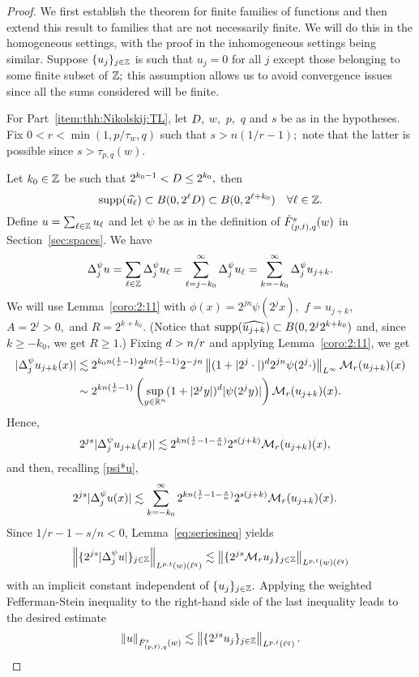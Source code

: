 \begin{proof} We first establish the theorem for finite families of functions and then extend this result to families that are not necessarily finite.  We will do this in the homogeneous settings, with the proof in the inhomogeneous settings being similar. Suppose $\{u_j\}_{j\in\ent}$ is such that $u_j=0$ for all $j$ except those belonging to some finite subset of $\ent;$  this assumption allows us to avoid convergence issues since all the sums  considered will be finite.

For Part~\eqref{item:thh:Nikolskij:TL}, let $\A,$ $w,$ $p,$ $q$ and $s$ be as in the hypotheses. Fix $0<r<\min(1,p/\tau_w,q)$ such that  $s>n(1/r-1);$ note that the latter is possible since $s>\tau_{p,q}(w).$ 


Let $k_0 \in \ent$ be such that $2^{k_0 -1} < \A\leq 2^{k_0},$ then  
$$
\supp(\widehat{u_\ell}) \subset B(0, 2^\ell \A) \subset B(0, 2^{\ell +k_0}) \quad \forall \ell \in \ent.
$$
Define $u =\sum_{\ell \in \ent} u_\ell$ and let $\psi$ be as in the definition of $\tlw{(p,t)}{s}{q}{w}$ in Section~\ref{sec:spaces}. We have
\begin{equation}\label{psi*u}
\Delta^\psi_j u = \sum_{\ell \in \ent} \Delta^\psi_j u_\ell = \sum_{\ell = j - k_0}^\infty \Delta^\psi_j  u_\ell = \sum_{k = - k_0}^\infty \Delta^\psi_j u_{j+k}.
\end{equation}
We will use Lemma~\ref{coro:2:11} with $\phi(x) =  2^{jn} \psi(2^j x),$  $f = u_{j+k},$  $A= 2^{j  } >0,$ and $R= 2^{k + k_0}.$ (Notice that $\supp(\widehat{u_{j+k}}) \subset  B(0, 2^{j} 2^{k + k_0})$ and, since $k \geq -k_0$, we get $R \geq 1$.) Fixing  $\ex>n/r$ and applying Lemma~\ref{coro:2:11}, we get
\begin{align*}
|\Delta^\psi_j  u_{j+k}(x)| & \lesssim   2^{k_0n(\frac{1}{r} -1)} 2^{k n (\frac{1}{r} -1)}  2^{-jn} \norm{(1 + |2^j \cdot|)^\ex 2^{jn}\psi (2^j\cdot)}{L^\infty}  \M_r(u_{j+k})(x)\\
& \sim  2^{k n (\frac{1}{r} -1)} \left( \sup_{y \in \rn} (1 + |2^j y|)^\ex |\psi(2^j y)|\right) \M_r(u_{j+k})(x).
\end{align*}
 Hence,
\begin{align*}
2^{js}|\Delta^\psi_j  u_{j+k}(x)| & \lesssim 2^{k n (\frac{1}{r} -1-\frac{s}{n})} 2^{s(j+k)}\M_r(u_{j+k})(x),
\end{align*}
and then, recalling \eqref{psi*u}, 
\begin{align*}
2^{js} |\Delta^\psi_j  u(x)| & \lesssim  \sum_{k =  - k_0}^\infty 2^{k n (\frac{1}{r} -1-\frac{s}{n})} 2^{s(j+k)}\M_r(u_{j+k})(x).
\end{align*}
Since $1/r -1-s/n < 0$,   Lemma~\ref{eq:seriesineq}  yields
$$
\norm{\{ 2^{js} |\Delta^\psi_j  u|\}_{j\in\ent}}{L^{p,t}(w)(\ell^{q})} \lesssim \norm{\{2^{js} \M_ru_j\}_{j\in\ent}}{L^{p,t}(w)(\ell^{q})}
$$
with an implicit constant independent of $\{u_j\}_{j\in \ent}.$
Applying the weighted  Fefferman-Stein inequality  to the right-hand side of the last inequality leads to the desired estimate
\begin{equation*}
\norm{u}{\tlw{(p,t)}{s}{q}{w}} \lesssim \norm{\{2^{js}u_j\}_{j\in\ent}}{L^{p,t}(\ell^{q})}.
\end{equation*}



\end{proof}
